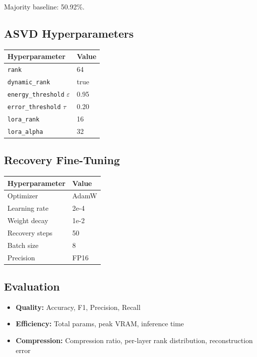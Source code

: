 Majority baseline: 50.92\%.

\subsection{ASVD Hyperparameters}

\begin{table}[H]
\centering
\small
\begin{tabular}{ll}
\toprule
\textbf{Hyperparameter} & \textbf{Value} \\
\midrule
\texttt{rank} & 64 \\
\texttt{dynamic\_rank} & true \\
\texttt{energy\_threshold} $\varepsilon$ & 0.95 \\
\texttt{error\_threshold} $\tau$ & 0.20 \\
\texttt{lora\_rank} & 16 \\
\texttt{lora\_alpha} & 32 \\
\bottomrule
\end{tabular}
\end{table}

\subsection{Recovery Fine-Tuning}

\begin{table}[H]
\centering
\small
\begin{tabular}{ll}
\toprule
\textbf{Hyperparameter} & \textbf{Value} \\
\midrule
Optimizer & AdamW \\
Learning rate & 2e-4 \\
Weight decay & 1e-2 \\
Recovery steps & 50 \\
Batch size & 8 \\
Precision & FP16 \\
\bottomrule
\end{tabular}
\end{table}

\subsection{Evaluation}

\begin{itemize}
\item \textbf{Quality:} Accuracy, F1, Precision, Recall
\item \textbf{Efficiency:} Total params, peak VRAM, inference time
\item \textbf{Compression:} Compression ratio, per-layer rank distribution, reconstruction error

\end{itemize}
